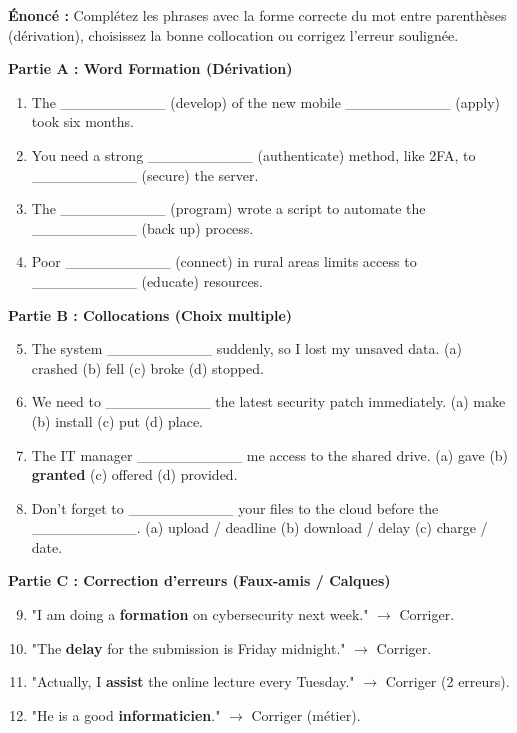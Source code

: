 \documentclass[11pt]{article}
\begin{document}
\begin{exoresolu}
\textbf{Énoncé :} Complétez les phrases avec la forme correcte du mot entre parenthèses (dérivation), choisissez la bonne collocation ou corrigez l'erreur soulignée.

\textbf{Partie A : Word Formation (Dérivation)}
\begin{enumerate}
    \item The \_\_\_\_\_\_\_\_\_\_ (develop) of the new mobile \_\_\_\_\_\_\_\_\_\_ (apply) took six months.
    \item You need a strong \_\_\_\_\_\_\_\_\_\_ (authenticate) method, like 2FA, to \_\_\_\_\_\_\_\_\_\_ (secure) the server.
    \item The \_\_\_\_\_\_\_\_\_\_ (program) wrote a script to automate the \_\_\_\_\_\_\_\_\_\_ (back up) process.
    \item Poor \_\_\_\_\_\_\_\_\_\_ (connect) in rural areas limits access to \_\_\_\_\_\_\_\_\_\_ (educate) resources.
\end{enumerate}

\textbf{Partie B : Collocations (Choix multiple)}
\begin{enumerate}
    \setcounter{enumi}{4}
    \item The system \_\_\_\_\_\_\_\_\_\_ suddenly, so I lost my unsaved data. (a) crashed (b) fell (c) broke (d) stopped.
    \item We need to \_\_\_\_\_\_\_\_\_\_ the latest security patch immediately. (a) make (b) install (c) put (d) place.
    \item The IT manager \_\_\_\_\_\_\_\_\_\_ me access to the shared drive. (a) gave (b) \textbf{granted} (c) offered (d) provided.
    \item Don't forget to \_\_\_\_\_\_\_\_\_\_ your files to the cloud before the \_\_\_\_\_\_\_\_\_\_. (a) upload / deadline (b) download / delay (c) charge / date.
\end{enumerate}

\textbf{Partie C : Correction d'erreurs (Faux-amis / Calques)}
\begin{enumerate}
    \setcounter{enumi}{8}
    \item "I am doing a \textbf{formation} on cybersecurity next week." $\to$ Corriger.
    \item "The \textbf{delay} for the submission is Friday midnight." $\to$ Corriger.
    \item "Actually, I \textbf{assist} the online lecture every Tuesday." $\to$ Corriger (2 erreurs).
    \item "He is a good \textbf{informaticien}." $\to$ Corriger (métier).
\end{enumerate}


\end{exoresolu}
\end{document}

